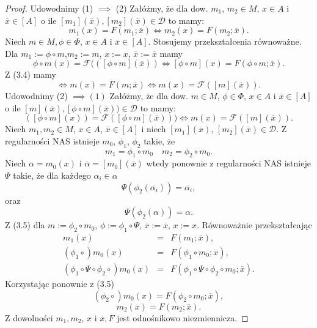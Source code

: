 \documentclass[12pt,a4paper]{report}
\newcommand{\domkniecie}[1]{\left[ {#1} \right] }
\begin{document}
\begin{proof}
Udowodnimy (1) $\implies$ (2)
Załóżmy, że dla dow. $m_{1}$, $ m_{2} \in M$, $x \in A$ i $\overline{x} \in \domkniecie{A}$ o ile $\domkniecie{m_1}(\overline{x}), \domkniecie{m_2}(\overline{x})\in \mathcal{D}$ to mamy:
\begin{equation}
 m_{1}(x)=F(m_{1};\overline{x}) \iff m_{2}(x)=F(m_{2};\overline{x}).
\end{equation}
Niech $m\in M, \phi \in \Phi$, $x \in A$ i $\overline{x}\in \domkniecie{A}$.
Stosujemy przekształcenia równoważne.
Dla $m_1:=\phi\circ m$,$ m_2:=m$, $x:=x$, $\overline{x}:=\overline{x}$ mamy
$$
\phi\circ m(x)=\mathcal{F}((\domkniecie{\phi \circ m}(\overline{x})) \iff \domkniecie{\phi \circ m}(x)=F(\phi \circ m;\overline{x}). 
$$
Z (3.4) mamy
$$
\iff m(x)=F(m;\overline{x}) \iff m(x)=\mathcal{F}(\domkniecie{m}(\overline{x})).
$$
Udowodnimy (2) $\implies (1)$
Załóżmy, że dla dow. $m \in M$, $\phi \in \Phi$, $ x \in A$ i $\overline{x} \in \domkniecie{A}$ o ile $\domkniecie{m}(\overline{x}), \domkniecie{\phi\circ m}(\overline{x})) \in \mathcal{D}$ to mamy:
\begin{equation}
(\domkniecie{\phi\circ m}(x))=\mathcal{F}( \domkniecie{\phi \circ m}(\overline{x}))) \iff m(x)=\mathcal{F}(\domkniecie{m}(\overline{x})).
\end{equation}
Niech $m_1,m_2 \in M$, $x \in A$, $\overline{x}\in \domkniecie{A}$ i niech $\domkniecie{m_1}(\overline{x})$, $\domkniecie{m_2}(\overline{x})\in \mathcal{D}$. Z regularności NAS istnieje $m_0$, $\phi_1$, $\phi_2$ takie, że
$$ 
m_1=\phi_1\circ m_0 \quad m_2=\phi_2\circ m_0.
$$
Niech $\alpha=m_0(x)$ i $\overline{\alpha}=\domkniecie{m_0}(\overline{x})$ wtedy ponownie z regularności NAS istnieje $\Psi$ takie, że dla każdego $\alpha_i \in \alpha$
$$
\Psi(\phi_2(\overline{\alpha_i}))=\overline{\alpha_i},
$$
oraz
$$
\Psi(\phi_2(\alpha))=\alpha.
$$
Z (3.5) dla $m:=\phi_2 \circ m_0$, $\phi:=\phi_1\circ \Psi$, $\overline{x}:=\overline{x}$, $x:=x$.
Równoważnie przekształcając
\begin{eqnarray*}
m_1(x) & = & F(m_1;\overline{x}), \\
 (\phi_1\circ) m_0(x) & = & F(\phi_1 \circ m_0;\overline{x}),\\
(\phi_1\circ\Psi\circ\phi_2\circ)m_0(x)&=&F(\phi_1\circ\Psi\circ\phi_2\circ m_0;\overline{x}). 
\end{eqnarray*}
Korzystając ponownie z (3.5)
$$
(\phi_2\circ )m_0(x)=F(\phi_2\circ m_0;\overline{x}), 
$$
$$
m_2(x)=F(m_2;\overline{x}).
$$
Z dowolności $m_1, m_2$, $x$ i $\overline{x}, F$ jest odnośnikowo niezmiennicza.


\end{proof}
\end{document}
